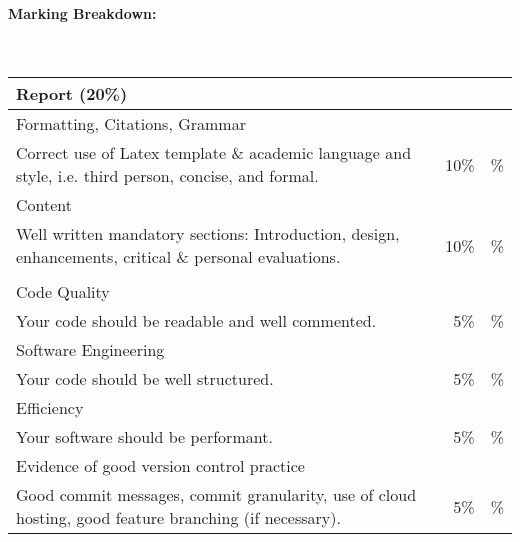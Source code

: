 \documentclass[letterpaper,11pt]{texMemo}
\begin{document}
\maketitle

\paragraph{Marking Breakdown:}\ \\

\begin{tabular}{ l r | l |}
\multicolumn{2}{l}{\textbf{Report (20\%)}} \\
\hline
Formatting, Citations, Grammar\\ 
\footnotesize{Correct use of Latex template \& academic language and style, i.e. third person, concise, and formal.}   
                                                                                &  10\% &   \%\\%

Content\\ 
\footnotesize{Well written mandatory sections: Introduction, design, enhancements, critical \& personal evaluations.} 
                                                                                &  10\% &   \%\\%

\noalign{\bigskip}
\multicolumn{2}{l}{\textbf{Source Code (20\%)}}    \\
\hline
Code Quality\\ \footnotesize{Your code should be readable and well commented.}  &   5\% &   \%\\%
Software Engineering\\ \footnotesize{Your code should be well structured.}      &   5\% &   \%\\%
Efficiency \\ \footnotesize{Your software should be performant.}                &   5\% &   \%\\%
Evidence of good version control practice \\ \footnotesize{Good commit messages, commit granularity, use of cloud hosting, good feature branching (if necessary).}                      &   5\% &   \%\\%


\end{tabular}
\end{document}
